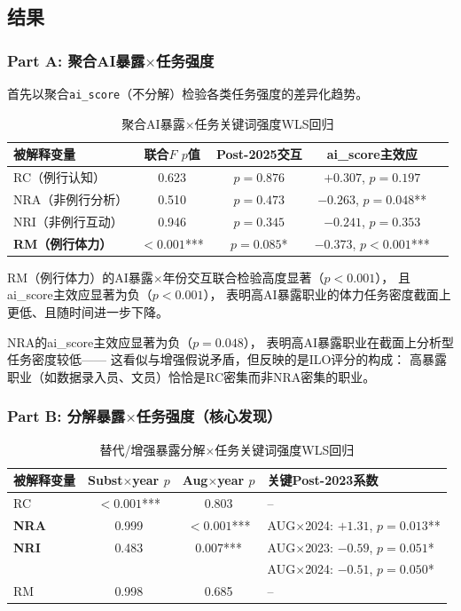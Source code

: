\documentclass[12pt,a4paper]{ctexart}
\begin{document}
\subsection{结果}

\subsubsection{Part A: 聚合AI暴露$\times$任务强度}

首先以聚合\texttt{ai\_score}（不分解）检验各类任务强度的差异化趋势。

\begin{table}[h!]
\centering
\caption{聚合AI暴露$\times$任务关键词强度WLS回归}
\label{tab:task_agg}
\begin{tabular}{lcccc}
\toprule
被解释变量 & 联合$F$ $p$值 & Post-2025交互 & ai\_score主效应 \\
\midrule
RC（例行认知） & 0.623 & $p=0.876$ & $+0.307$, $p=0.197$ \\
NRA（非例行分析） & 0.510 & $p=0.473$ & $-0.263$, $p=0.048$** \\
NRI（非例行互动） & 0.946 & $p=0.345$ & $-0.241$, $p=0.353$ \\
\textbf{RM（例行体力）} & $\mathbf{<0.001}$*** & $p=0.085$* & $-0.373$, $p<0.001$*** \\
\bottomrule
\end{tabular}
\end{table}

RM（例行体力）的AI暴露$\times$年份交互联合检验高度显著（$p<0.001$），
且ai\_score主效应显著为负（$p<0.001$），
表明高AI暴露职业的体力任务密度截面上更低、且随时间进一步下降。

NRA的ai\_score主效应显著为负（$p=0.048$），
表明高AI暴露职业在截面上分析型任务密度较低——
这看似与增强假说矛盾，但反映的是ILO评分的构成：
高暴露职业（如数据录入员、文员）恰恰是RC密集而非NRA密集的职业。

\subsubsection{Part B: 分解暴露$\times$任务强度（核心发现）}

\begin{table}[h!]
\centering
\caption{替代/增强暴露分解$\times$任务关键词强度WLS回归}
\label{tab:task_decomp}
\small
\begin{tabular}{lccl}
\toprule
被解释变量 & Subst$\times$year $p$ & Aug$\times$year $p$ & 关键Post-2023系数 \\
\midrule
RC & $\mathbf{<0.001}$*** & 0.803 & -- \\
\textbf{NRA} & 0.999 & $\mathbf{<0.001}$*** & AUG$\times$2024: $+1.31$, $p=0.013$** \\
\textbf{NRI} & 0.483 & $\mathbf{0.007}$*** & AUG$\times$2023: $-0.59$, $p=0.051$* \\
 & & & AUG$\times$2024: $-0.51$, $p=0.050$* \\
RM & 0.998 & 0.685 & -- \\
\bottomrule
\end{tabular}
\end{table}
\end{document}

